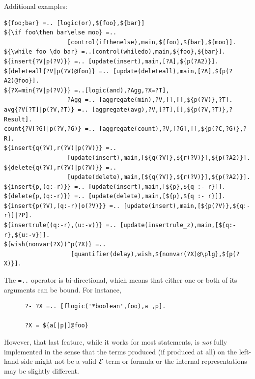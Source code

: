 \documentclass[11pt]{article}
\newcommand{\ERGO}{\mbox{\ensuremath{\cal{E}}\smaller{{\sc{RGO}}}}\xspace}
\newcommand{\FLSYSTEM}{\ERGO}
\begin{document}
\noindent
Additional examples:
\begin{verbatim}
${foo;bar} =.. [logic(or),${foo},${bar}]
${\if foo\then bar\else moo} =..
                  [control(ifthenelse),main,${foo},${bar},${moo}].
${\while foo \do bar} =..[control(whiledo),main,${foo},${bar}].
${insert{?V|p(?V)}} =.. [update(insert),main,[?A],${p(?A2)}].
${deleteall{?V|p(?V)@foo}} =.. [update(deleteall),main,[?A],${p(?A2)@foo}].
${?X=min{?V|p(?V)}} =..[logic(and),?Agg,?X=?T],
                  ?Agg =.. [aggregate(min),?V,[],[],${p(?V)},?T].
avg{?V[?T]|p(?V,?T)} =.. [aggregate(avg),?V,[?T],[],${p(?V,?T)},?Result].
count{?V[?G]|p(?V,?G)} =.. [aggregate(count),?V,[?G],[],${p(?C,?G)},?R].
${insert{q(?V),r(?V)|p(?V)}} =..
                  [update(insert),main,[${q(?V)},${r(?V)}],${p(?A2)}].
${delete{q(?V),r(?V)|p(?V)}} =..
                  [update(delete),main,[${q(?V)},${r(?V)}],${p(?A2)}].
${insert{p,(q:-r)}} =.. [update(insert),main,[${p},${q :- r}]].
${delete{p,(q:-r)}} =.. [update(delete),main,[${p},${q :- r}]].
${insert{p(?V),(q:-r)|o(?V)}} =.. [update(insert),main,[${p(?V)},${q:-r}]|?P].
${insertrule{(q:-r),(u:-v)}} =.. [update(insertrule_z),main,[${q:-r},${u:-v}]].
${wish(nonvar(?X))^p(?X)} =..
                   [quantifier(delay),wish,${nonvar(?X)@\plg},${p(?X)}].
\end{verbatim}

The {\tt =..} operator is bi-directional, which means that either one or
both of its arguments can be bound. For instance, 
\begin{verbatim}
      ?- ?X =.. [flogic('*boolean',foo),a ,p].
 
      ?X = ${a[|p|]@foo}
\end{verbatim}
However, that last feature, while it works for most statements,
is \emph{not} fully implemented in the sense
that the terms produced (if produced at all) on the left-hand side might
not be a valid \FLSYSTEM term or formula or the internal representations
may be slightly different.
\end{document}
